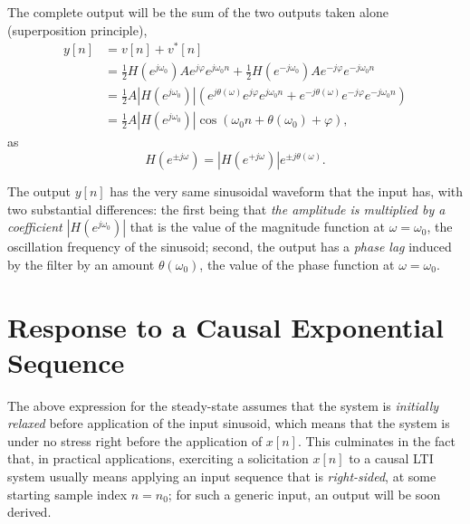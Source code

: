 \documentclass[\documentfontsize, twocolumn]{\classname}
\begin{document}
The complete output will be the sum of the two outputs taken alone (superposition principle),
\begin{align*}
    y[n]
    &= v[n] + v^*[n]\\
    &= \frac 1 2 H(e^{j\omega_0})Ae^{j\varphi}e^{j\omega_0n} + \frac 1 2 H(e^{-j\omega_0})Ae^{-j\varphi}e^{-j\omega_0n}\\
    &= \frac 1 2 A\left|H(e^{j\omega_0})\right|\left(e^{j\theta(\omega)}e^{j\varphi}e^{j\omega_0n} + e^{-j\theta(\omega)}e^{-j\varphi}e^{-j\omega_0n}\right)\\
    &= \frac 1 2 A\left|H(e^{j\omega_0})\right|\cos{(\omega_0n + \theta(\omega_0) + \varphi)},
\end{align*}
as 
\[
    H(e^{\pm j\omega}) = \left|H(e^{+ j\omega})\right|e^{\pm j\theta(\omega)}.
\]

The output $y[n]$ has the very same sinusoidal waveform that the input has, with two substantial differences: the first being that \emph{the amplitude is multiplied by a coefficient $\left|H(e^{j\omega_0})\right|$} that is the value of the magnitude function at $\omega = \omega_0$, the oscillation frequency of the sinusoid; second, the output has a \emph{phase lag} induced by the filter by an amount $\theta(\omega_0)$, the value of the phase function at $\omega = \omega_0$.

\section{Response to a Causal Exponential Sequence}
The above expression for the steady-state assumes that the system is \emph{initially relaxed} before application of the input sinusoid, which means that the system is under no stress right before the application of $x[n]$. This culminates in the fact that, in practical applications, exerciting a solicitation $x[n]$ to a causal LTI system usually means applying an input sequence that is \emph{right-sided}, at some starting sample index $n = n_0$; for such a generic input, an output will be soon derived.
\end{document}
